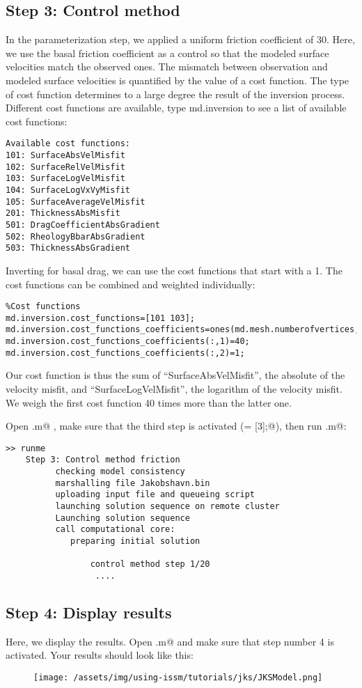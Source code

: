 \subsection{Step 3: Control method}
In the parameterization step, we applied a uniform friction coefficient of 30. Here, we use the basal friction coefficient as a control so that the modeled surface velocities
match the observed ones. The mismatch between observation and modeled surface velocities is quantified by the value of a
cost function. The type of cost function determines to a large degree the result of the inversion process. Different cost functions are available, type md.inversion to see a list of available cost functions:
\begin{verbatim}Available cost functions:
101: SurfaceAbsVelMisfit
102: SurfaceRelVelMisfit
103: SurfaceLogVelMisfit
104: SurfaceLogVxVyMisfit
105: SurfaceAverageVelMisfit
201: ThicknessAbsMisfit
501: DragCoefficientAbsGradient
502: RheologyBbarAbsGradient
503: ThicknessAbsGradient\end{verbatim}
Inverting for basal drag, we can use the cost functions that start with a 1. The cost functions can be combined and weighted individually:
\begin{verbatim}%Cost functions
md.inversion.cost_functions=[101 103];
md.inversion.cost_functions_coefficients=ones(md.mesh.numberofvertices,2);
md.inversion.cost_functions_coefficients(:,1)=40;
md.inversion.cost_functions_coefficients(:,2)=1;\end{verbatim}
Our cost function is thus the sum of ``SurfaceAbsVelMisfit'', the absolute of the velocity misfit, and ``SurfaceLogVelMisfit'', the logarithm of the velocity misfit. We weigh the first cost function 40 times more than the latter one.

Open \verb@runme.m@ , make sure that the third step is activated (\verb@steps = [3];@), then run \verb@runme.m@:
\begin{verbatim}>> runme
	Step 3: Control method friction
		  checking model consistency
		  marshalling file Jakobshavn.bin
		  uploading input file and queueing script
		  launching solution sequence on remote cluster
		  Launching solution sequence
		  call computational core:
		     preparing initial solution

			     control method step 1/20
				  ....\end{verbatim}

\subsection{Step 4: Display results}
Here, we display the results. Open \verb@runme.m@ and make sure that step number 4 is activated. Your results should look like this:
\begin{figure}[H]
	\begin{center}
		\texttt{[image: /assets/img/using-issm/tutorials/jks/JKSModel.png]}
	\end{center}
\end{figure}
